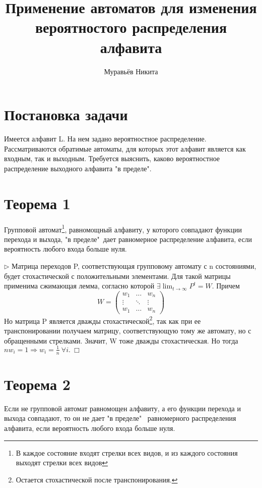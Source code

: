 \documentclass[12pt]{article}
\title{\textbf{Применение автоматов для изменения вероятностого распределения алфавита}}
\author{Муравьёв Никита}
\date{}
\begin{document}
\maketitle

\section{Постановка задачи}
Имеется алфавит L. На нем задано вероятностное распределение. Рассматриваются обратимые автоматы, для которых этот алфавит является как входным, так и выходным. Требуется выяснить, каково вероятностное распределение выходного алфавита "в пределе".

\section{Теорема 1}
Групповой автомат\footnote{В каждое состояние входят стрелки всех видов, и из каждого состояния выходят стрелки всех видов}, равномощный алфавиту, у которого совпадают функции перехода и выхода, "в пределе"\ дает равномерное распределение алфавита, если вероятность любого входа больше нуля.

$\triangleright$ Матрица переходов P, соответствующая групповому автомату с n состояниями, будет стохастической с положительными элементами. Для такой матрицы применима  сжимающая лемма, согласно которой $\exists\lim_{t\to \infty} P^{t}=W.$ Причем 
$$W = \left(\begin{array}{ccc}
w_1 & \dots & w_n\\
\vdots & \ddots & \vdots\\
w_1 & \dots & w_n
\end{array}\right)$$
Но матрица P является дважды стохастической\footnote{Остается стохастической после транспонирования.}, так как при ее транспонировании получаем матрицу, соответствующую тому же автомату, но с обращенными стрелками. Значит, W тоже дважды стохастическая. Но тогда $nw_i=1\Rightarrow w_i = \frac{1}{n} \  \forall i.\ \Box$ 

\section{Теорема 2}
Если не групповой автомат равномощен алфавиту, а его функции перехода и выхода совпадают, то он не дает "в пределе" \ равномерного распределения алфавита, если вероятность любого входа больше нуля.
\end{document}
